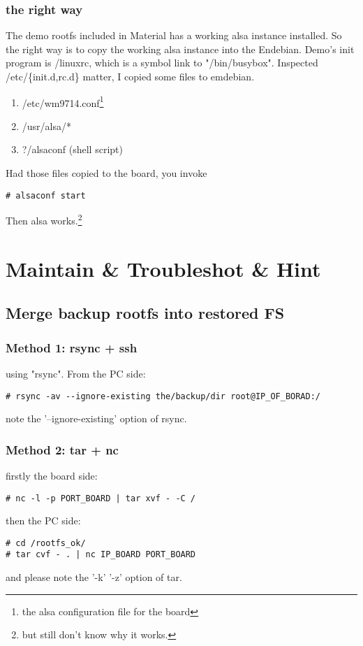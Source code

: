 \documentclass[11pt,a4paper]{article}
\begin{document}
\begin{CJK}{UTF8}{gbsn}
\subsubsection{the right way}
The demo rootfs included in Material has a working alsa instance
installed. So the right way is to copy the working alsa instance into
the Endebian.\newline
Demo's init program is /linuxrc, which is a symbol link to "/bin/busybox". Inspected
/etc/\{init.d,rc.d\} matter, I copied some files to emdebian.
\begin{enumerate}
\item /etc/wm9714.conf\footnote{the alsa configuration file for the board}
\item /usr/alsa/*
\item ?/alsaconf (shell script)
\end{enumerate}
Had those files copied to the board, you invoke
\begin{verbatim}
# alsaconf start
\end{verbatim}
Then alsa works.\footnote{but still don't know why it works.}

\section{Maintain \& Troubleshot \& Hint}
\subsection{Merge backup rootfs into restored FS}
\subsubsection{Method 1: rsync + ssh}
using "rsync". From the PC side:
\begin{verbatim}
# rsync -av --ignore-existing the/backup/dir root@IP_OF_BORAD:/
\end{verbatim}
note the '--ignore-existing' option of rsync.
\subsubsection{Method 2: tar + nc}
firstly the board side:
\begin{verbatim}
# nc -l -p PORT_BOARD | tar xvf - -C /
\end{verbatim}
then the PC side:
\begin{verbatim}
# cd /rootfs_ok/
# tar cvf - . | nc IP_BOARD PORT_BOARD
\end{verbatim}
and please note the '-k' '-z' option of tar.


\end{CJK}
\end{document}
